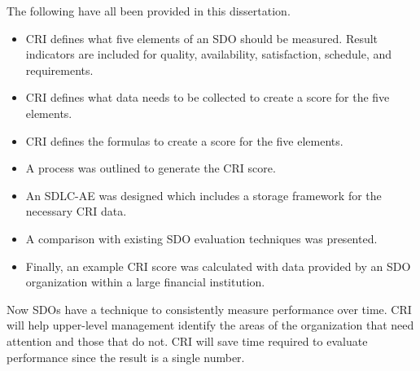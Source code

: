 \documentclass[SDSUThesis.tex]{subfiles}
\begin{document}
    The following have all been provided in this dissertation.
    \begin{itemize}
        \item CRI defines what five elements of an SDO should be measured.
            Result indicators are included for quality, availability, satisfaction,
            schedule, and requirements. 
        \item CRI defines what data needs to be collected to create a 
            score for the five elements.
        \item CRI defines the formulas to create a score for the five elements.
        \item A process was outlined to generate the CRI score.
        \item An SDLC-AE was designed which includes a storage 
            framework for the necessary CRI data.
        \item A comparison with existing SDO evaluation techniques was presented.
        \item Finally, an example CRI score was calculated with data provided by
            an SDO organization within a large financial institution.
    \end{itemize}
    
    Now SDOs have a technique to consistently measure performance over time.  CRI
    will help upper-level management identify the areas of the organization
    that need attention and those that do not.  CRI will save time required to 
    evaluate performance since the result is a single number.  
    
    
\end{document}
